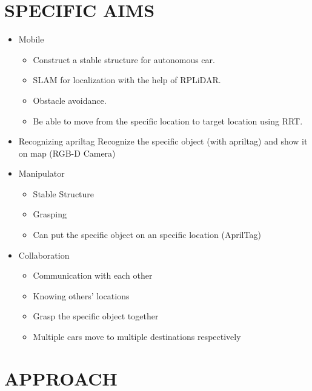 \documentclass[a4paper, 10pt, conference]{ieeeconf}      %
\begin{document}
\section{SPECIFIC AIMS}
\begin{itemize}
\item Mobile
\begin{itemize}
	\item Construct a stable structure for autonomous car.
	\item SLAM for localization with the help of RPLiDAR.
	\item Obstacle avoidance.
	\item Be able to move from the specific location to target location using RRT.
\end{itemize}

\item Recognizing apriltag 
Recognize the specific object (with apriltag) and show it on map (RGB-D Camera)

\item Manipulator
\begin{itemize}
	\item Stable Structure
	\item Grasping
	\item Can put the specific object on an specific location (AprilTag)
\end{itemize}

\item Collaboration
\begin{itemize}
	\item Communication with each other
	\item Knowing others’ locations
	\item Grasp the specific object together
	\item Multiple cars move to multiple destinations respectively
\end{itemize}
\end{itemize}

\section{APPROACH}
\end{document}
